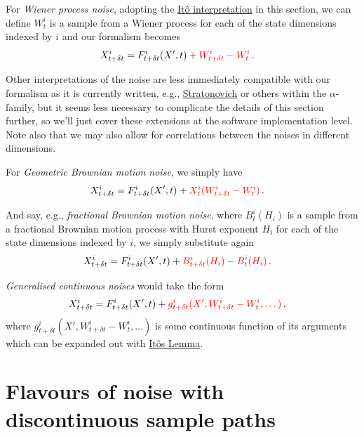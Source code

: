 \documentclass{book}
\begin{document}
For \emph{Wiener process noise}, adopting the \href{https://en.wikipedia.org/wiki/It\%C3\%B4_calculus}{Itô interpretation} in this section, we can define $W^i_{t}$ is a sample from a Wiener process for each of the state dimensions indexed by $i$ and our formalism becomes
\begin{align}
& X^i_{t+\delta t} = F^i_{t+\delta t}(X', t) + \textcolor{red}{W^i_{t+\delta t}-W^i_{t}}\,.
\end{align}

Other interpretations of the noise are less immediately compatible with our formalism as it is currently written, e.g., \href{https://en.wikipedia.org/wiki/Stratonovich_integral}{Stratonovich} or others within the $\alpha$-family, but it seems less necessary to complicate the details of this section further, so we'll just cover these extensions at the software implementation level. Note also that we may also allow for correlations between the noises in different dimensions. 

For \emph{Geometric Brownian motion noise}, we simply have
\begin{align}
& X^i_{t+\delta t} = F^i_{t+\delta t}(X', t) + \textcolor{red}{X^i_{t}(W^i_{t+\delta t}-W^i_{t})}\,.
\end{align}

And say, e.g., \emph{fractional Brownian motion noise}, where $B^i_{t}({H_i})$ is a sample from a fractional Brownian motion process with Hurst exponent $H_i$ for each of the state dimensions indexed by $i$, we simply substitute again
\begin{align}
& X^i_{t+\delta t} = F^i_{t+\delta t}(X', t) + \textcolor{red}{B^i_{t+\delta t}({H_i})-B^i_{t}({H_i})}\,.
\end{align}

\emph{Generalised continuous noises} would take the form
\begin{align}
& X^i_{t+\delta t} = F^i_{t+\delta t}(X', t) + \textcolor{red}{g^i_{t+\delta t}(X', W^i_{t+\delta t}-W^i_t, \dots)}\,,
\end{align}
where $g^i_{t+\delta t}(X', W^i_{t+\delta t}-W^i_t, \dots)$ is some continuous function of its arguments which can be expanded out with \href{https://en.wikipedia.org/wiki/It\%C3\%B4\%27s_lemma}{Itôs Lemma}.


\section{\sffamily Flavours of noise with discontinuous sample paths}
\end{document}
